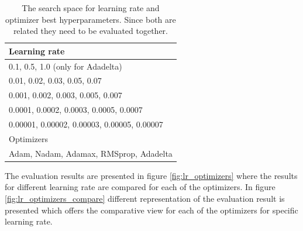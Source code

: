 
\begin{table}[ht]
 \centering
 \caption{The search space for learning rate and optimizer best hyperparameters. Since both are related they need to be evaluated together.}
 \begin{tabular}{|l|} 
 \hline\hline
 \rowcolor{lightgrey}
 Learning rate \\[0.5ex] 
 \hline
 0.1, 0.5, 1.0 (only for Adadelta)\\
 0.01, 0.02, 0.03, 0.05, 0.07\\
 0.001, 0.002, 0.003, 0.005, 0.007\\
 0.0001, 0.0002, 0.0003, 0.0005, 0.0007\\
 0.00001, 0.00002, 0.00003, 0.00005, 0.00007\\
 \rowcolor{lightgrey}
 \hline
 Optimizers\\
 \hline
 Adam, Nadam, Adamax, RMSprop, Adadelta \\
 \hline \hline
\end{tabular}
\label{table:search_space_optimizers}
\end{table}

The evaluation results are presented in figure \ref{fig:lr_optimizers} where the results for different learning rate are compared for each of the optimizers. In figure \ref{fig:lr_optimizers_compare} different representation of the evaluation
result is presented which offers the comparative view for each of the optimizers for specific learning rate.

